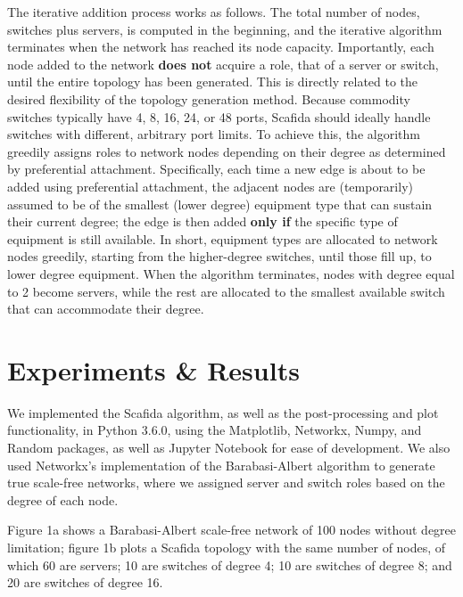 The iterative addition process works as follows. The total number of nodes, switches plus servers, is computed in the beginning, and the iterative algorithm terminates when the network has reached its node capacity. Importantly, each node added to the network \textbf{does not} acquire a role, that of a server or switch, until the entire topology has been generated. This is directly related to the desired flexibility of the topology generation method. Because commodity switches typically have 4, 8, 16, 24, or 48 ports, Scafida should ideally handle switches with different, arbitrary port limits. To achieve this, the algorithm greedily assigns roles to network nodes depending on their degree as determined by preferential attachment. Specifically, each time a new edge is about to be added using preferential attachment, the adjacent nodes are (temporarily) assumed to be of the smallest (lower degree) equipment type that can sustain their current degree; the edge is then added \textbf{only if} the specific type of equipment is still available. In short, equipment types are allocated to network nodes greedily, starting from the higher-degree switches, until those fill up, to lower degree equipment. When the algorithm terminates, nodes with degree equal to 2 become servers, while the rest are allocated to the smallest available switch that can accommodate their degree.

\section{Experiments \& Results}

We implemented the Scafida algorithm, as well as the post-processing and plot functionality, in Python 3.6.0, using the Matplotlib, Networkx, Numpy, and Random packages, as well as Jupyter Notebook for ease of development. We also used Networkx's implementation of the Barabasi-Albert algorithm to generate true scale-free networks, where we assigned server and switch roles based on the degree of each node.

Figure 1a shows a Barabasi-Albert scale-free network of 100 nodes without degree limitation; figure 1b plots a Scafida topology with the same number of nodes, of which 60 are servers; 10 are switches of degree 4; 10 are switches of degree 8;  and 20 are switches of degree 16. 

